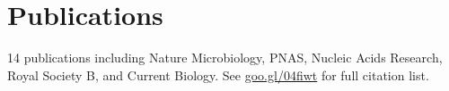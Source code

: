 \documentclass[]{Finlay_Maguire_CV}
\begin{document}
\begin{minipage}[t]{0.66\textwidth}
\sectionsep

\vspace{-0.3cm}
\section{Publications} 
%
%
14 publications including Nature Microbiology, PNAS, Nucleic Acids Research, Royal Society B, and Current Biology.
See \url{goo.gl/04fiwt} for full citation list.

\end{minipage}
\end{document}
